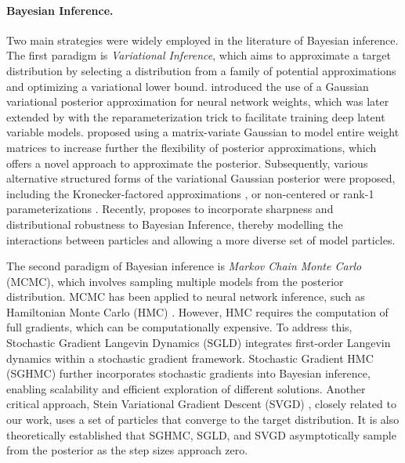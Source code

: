 \paragraph{Bayesian Inference.} Two main strategies were widely employed in the literature of Bayesian inference. The first paradigm is \textit{Variational Inference}, which aims to approximate a target distribution by selecting a distribution from a family of potential approximations and optimizing a variational lower bound. \citet{graves2011practical} introduced the use of a Gaussian variational posterior approximation for neural network weights, which was later extended by \citet{kingma2013auto, kingma2015variational, blundell2015weight} with the reparameterization trick to facilitate training deep latent variable models. \citet{louizos2017multiplicative} proposed using a matrix-variate Gaussian to model entire weight matrices \citep{gupta2018matrix} to increase further the flexibility of posterior approximations, which offers a novel approach to approximate the posterior. Subsequently, various alternative structured forms of the variational Gaussian posterior were proposed, including the Kronecker-factored approximations \citep{zhang2018noisy, ritter2018scalable, rossi2020walsh}, or non-centered or rank-1 parameterizations \citep{ghosh2018structured, dusenberry2020efficient}. Recently, \citet{quan2025promoting} proposes to incorporate sharpness and distributional robustness to Bayesian Inference, thereby modelling the interactions between particles and allowing a more diverse set of model particles. 

The second paradigm of Bayesian inference is \textit{Markov Chain Monte Carlo} (MCMC), which involves sampling multiple models from the posterior distribution. MCMC has been applied to neural network inference, such as Hamiltonian Monte Carlo (HMC) \citep{Neal_Bayesian}. However, HMC requires the computation of full gradients, which can be computationally expensive. To address this, Stochastic Gradient Langevin Dynamics (SGLD) \citep{sgld} integrates first-order Langevin dynamics within a stochastic gradient framework. Stochastic Gradient HMC (SGHMC) \citep{chen2014stochastic} further incorporates stochastic gradients into Bayesian inference, enabling scalability and efficient exploration of different solutions. Another critical approach, Stein Variational Gradient Descent (SVGD) \citep{svgd}, closely related to our work, uses a set of particles that converge to the target distribution. It is also theoretically established that SGHMC, SGLD, and SVGD asymptotically sample from the posterior as the step sizes approach zero.